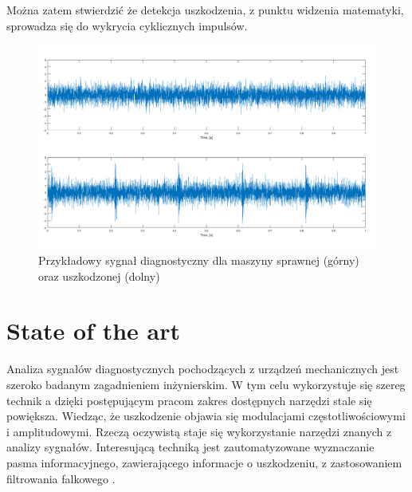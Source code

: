 \documentclass[inzynierska]{pwr_wmat_praca_dyplomowa}
\theoremstyle{plain}
\numberwithin{theorem}{chapter}
\theoremstyle{definition}
\numberwithin{theorem}{chapter}
\begin{document}
Można zatem stwierdzić że detekcja uszkodzenia, z punktu widzenia matematyki, sprowadza się do wykrycia cyklicznych impulsów. 
\begin{figure}[ht]
	\centering
	\includegraphics[scale=0.35]{images/zdrowy_pulsacja.png}
	\caption{Przykładowy sygnał diagnostyczny dla maszyny sprawnej (górny) oraz uszkodzonej (dolny)}
	\label{sygnal}
\end{figure}



\section{State of the art}
Analiza sygnałów diagnostycznych pochodzących z urządzeń mechanicznych jest szeroko badanym zagadnieniem inżynierskim. W tym celu wykorzystuje się szereg technik a dzięki postępującym pracom zakres dostępnych narzędzi stale się powiększa. Wiedząc, że uszkodzenie objawia się modulacjami częstotliwościowymi i amplitudowymi. Rzeczą oczywistą staje się wykorzystanie narzędzi znanych z analizy sygnałów.
Interesującą techniką jest zautomatyzowane wyznaczanie pasma informacyjnego, zawierającego informacje o uszkodzeniu, z zastosowaniem filtrowania falkowego \cite{linandzuo}. 
\end{document}
